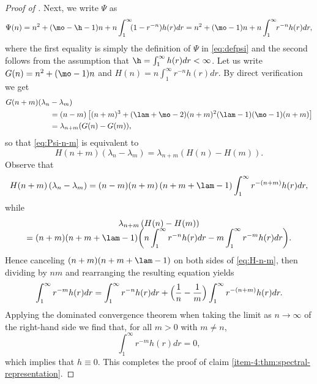 \begin{proof}[Proof of ]
Next, we write $\Psi$ as
\begin{equation*}
\Psi(n) = n^2 + (\mo-\h-1)n + n \int_1^\infty\hspace*{-1mm} (1-r^{-n})h(r)dr = n^2 + (\mo-1)n + n\int_1^\infty\hspace*{-1mm} r^{-n}h(r)dr,
\end{equation*}
where the first equality is simply the definition of $\Psi$ in \eqref{eq:defpsi} and the second follows from the assumption that $\h = \int_1^\infty h(r) dr < \infty$. Let us write $G(n) = n^2+(\mo-1)n$ and $H(n) = n\int_1^\infty r^{-n}h(r)dr$. By direct verification we get
\begin{align*}
G(n+m)(\lambda_n&-\lambda_m)\\
 &= (n-m)\left[(n+m)^3+(\lam + \mo-2)(n+m)^2 (\lam-1)(\mo-1)(n+m)\right] \\
&= \lambda_{n+m}(G(n)-G(m)),
\end{align*}
so that \eqref{eq:Psi-n-m} is equivalent to
\begin{equation}
\label{eq:H-n-m}
H(n+m)(\lambda_n-\lambda_m) = \lambda_{n+m}(H(n)-H(m)).
\end{equation}
Observe that
\begin{equation*}
H(n+m)\left(\lambda_n-\lambda_m\right) = (n-m)(n+m)\left(n+m+\lam-1\right) \int_1^\infty r^{-(n+m)}h(r)dr,
\end{equation*}
while
\begin{multline*}
\lambda_{n+m}\left(H(n)-H(m)\right)\\[-5pt]
= (n+m)(n+m+\lam-1)\biggl(n\int_1^\infty r^{-n}h(r)dr - m\int_1^\infty r^{-m}h(r)dr \biggr).
\end{multline*}
Hence canceling $(n+m)(n+m+\lam-1)$ on both sides of \eqref{eq:H-n-m}, then dividing by $nm$ and rearranging the resulting equation yields
\begin{equation*}
\int_1^\infty r^{-m} h(r)dr = \int_1^\infty r^{-n}h(r)dr + \Bigl(\frac{1}{n}-\frac{1}{m}\Bigr) \int_1^\infty r^{-(n+m)} h(r)dr.
\end{equation*}
Applying the dominated convergence theorem when taking the limit as $n \to \infty$ of the right-hand side we find that, for all $m > 0$ with $m \neq n$,
\begin{equation*}
\int_1^\infty r^{-m} h(r)dr = 0,
\end{equation*}
which implies that $h \equiv 0$. This completes the proof of claim \eqref{item-4:thm:spectral-representation}.\end{proof}

